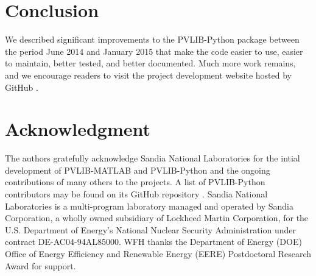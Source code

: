\documentclass[conference]{IEEEtran}
\begin{document}
\section{Conclusion}
We described significant improvements to the PVLIB-Python package between the period June 2014 and January 2015 that make the code easier to use, easier to maintain, better tested, and better documented. 
Much more work remains, and we encourage readers to visit the project development website hosted by GitHub \cite{pvlib-github}.


\section*{Acknowledgment}
The authors gratefully acknowledge Sandia National Laboratories for the intial development of PVLIB-MATLAB and PVLIB-Python and the ongoing contributions of many others to the projects.
A list of PVLIB-Python contributors may be found on its GitHub repository \cite{pvlib-github}.
Sandia National Laboratories is a multi-program laboratory managed and operated by Sandia Corporation, a wholly owned subsidiary of Lockheed Martin Corporation, for the U.S. Department of Energy's National Nuclear Security Administration under contract DE-AC04-94AL85000.
WFH thanks the Department of Energy (DOE) Office of Energy Efficiency and Renewable Energy (EERE) Postdoctoral Research Award for support. 

\vfil\eject







\end{document}
